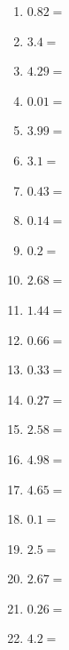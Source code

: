 \documentclass[12pt]{article}
\begin{document}
\begin{enumerate}
\item \large $ 0.82 = $ \vspace{1.5cm}
\item \large $ 3.4 = $ \vspace{1.5cm}
\item \large $ 4.29 = $ \vspace{1.5cm}
\item \large $ 0.01 = $ \vspace{1.5cm}
\newpage
\item \large $ 3.99 = $ \vspace{1.5cm}
\item \large $ 3.1 = $ \vspace{1.5cm}
\item \large $ 0.43 = $ \vspace{1.5cm}
\item \large $ 0.14 = $ \vspace{1.5cm}
\item \large $ 0.2 = $ \vspace{1.5cm}
\item \large $ 2.68 = $ \vspace{1.5cm}
\item \large $ 1.44 = $ \vspace{1.5cm}
\item \large $ 0.66 = $ \vspace{1.5cm}
\item \large $ 0.33 = $ \vspace{1.5cm}
\item \large $ 0.27 = $ \vspace{1.5cm}
\newpage
\item \large $ 2.58 = $ \vspace{1.5cm}
\item \large $ 4.98 = $ \vspace{1.5cm}
\item \large $ 4.65 = $ \vspace{1.5cm}
\item \large $ 0.1 = $ \vspace{1.5cm}
\item \large $ 2.5 = $ \vspace{1.5cm}
\item \large $ 2.67 = $ \vspace{1.5cm}
\item \large $ 0.26 = $ \vspace{1.5cm}
\item \large $ 4.2 = $ \vspace{1.5cm}

\end{enumerate}
\end{document}
